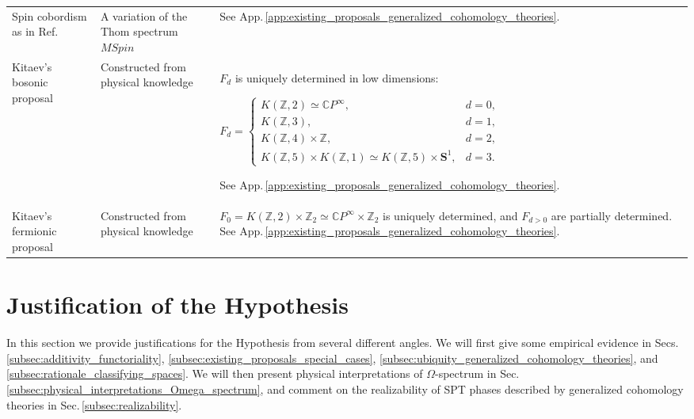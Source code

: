 \documentclass[sort&compress]{elsarticle}
\theoremstyle{theoremstyle}
\theoremstyle{framedtheoremstyle}
\theoremstyle{definitionstyle}
\theoremstyle{definitionstyle}
\theoremstyle{definitionstyle}
\theoremstyle{definitionstyle}
\theoremstyle{nameddefinitionstyle}
\theoremstyle{framednameddefinitionstyle}
\theoremstyle{proofstyle}
\theoremstyle{definitionstyle}
\newcommand{\ZZZ}{\mathbb{Z}}
\newcommand{\CCC}{\mathbb{C}}
\renewcommand{\SS}{\mathbf{S}}
\newcommand{\K}{\mathcal{K}}
\newcommand{\homotopic}{\simeq}
\begin{document}
\begin{table}
{\begin{tabular}{p{4.8cm}p{3cm}p{6.2cm}}
Spin cobordism as in Ref.\,\cite{Kapustin_Fermion} & A variation of the Thom spectrum $MSpin$ & See App.\,\ref{app:existing_proposals_generalized_cohomology_theories}. \\
Kitaev's bosonic proposal \cite{Kitaev_Stony_Brook_2011_SRE_1, Kitaev_Stony_Brook_2013_SRE} & Constructed from physical knowledge & $F_d$ is uniquely determined in low dimensions:\par
$F_d = \begin{cases} K(\ZZZ,2) \homotopic \CCC P^\infty, & d=0, \\ K(\ZZZ,3), & d = 1, \\K(\ZZZ, 4)\times \ZZZ, & d=2, \\K(\ZZZ, 5) \times K(\ZZZ,1) \homotopic K(\ZZZ, 5) \times \SS^1, & d=3. \end{cases}$\par
See App.\,\ref{app:existing_proposals_generalized_cohomology_theories}. \\
Kitaev's fermionic proposal \cite{Kitaev_Stony_Brook_2013_SRE, Kitaev_IPAM} & Constructed from physical knowledge & $F_0 = K(\ZZZ, 2)\times \ZZZ_2 \homotopic \CCC P^\infty \times \ZZZ_2$ is uniquely determined, and $F_{d>0}$ are partially determined. See App.\,\ref{app:existing_proposals_generalized_cohomology_theories}.\\
\hline
\hline
\end{tabular}
}
\label{table:existing_proposals}
\end{table}











\section{Justification of the Hypothesis\label{sec:justification_hypothesis}}

In this section we provide justifications for the Hypothesis from several different angles. We will first give some empirical evidence in Secs.\,\ref{subsec:additivity_functoriality}, \ref{subsec:existing_proposals_special_cases}, \ref{subsec:ubiquity_generalized_cohomology_theories}, and \ref{subsec:rationale_classifying_spaces}. We will then present physical interpretations of $\Omega$-spectrum in Sec.\,\ref{subsec:physical_interpretations_Omega_spectrum}, and comment on the realizability of SPT phases described by generalized cohomology theories in Sec.\,\ref{subsec:realizability}.
\end{document}
